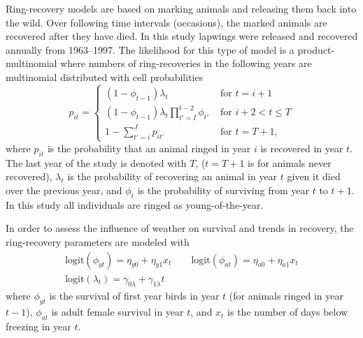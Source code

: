 \documentclass[12pt]{article}
\begin{document}
Ring-recovery models are based on marking animals and releasing them back into the wild. Over following time intervals (occasions), the marked animals are recovered after they have died. In this study lapwings were released and recovered annually from 1963--1997. The likelihood for this type of model is a product-multinomial where numbers of ring-recoveries in the following years are multinomial distributed with cell probabilities
\[
p_{it} = \left\{ 
\begin{array}{ll}
(1-\phi_{t-1})\lambda_t & \text{ for } t=i+1 \\
(1-\phi_{t-1})\lambda_t\prod_{t'=I}^{t-2} \phi_{t'} & \text{ for } i+2 < t \le T \\
1-\sum_{t'=i}^J p_{it'} & \text{ for } t=T+1,
\end{array} \right.
\]
where $p_{it}$ is the probability that an animal ringed in year $i$ is recovered in year $t$. The last year of the study is denoted with $T$, ($t=T+1$ is for animals never recovered), $\lambda_t$ is the probability of recovering an animal in year $t$ given it died over the previous year, and $\phi_t$ is the probability of surviving from year $t$ to $t+1$. In this study all individuals are ringed as young-of-the-year. 

In order to assess the influence of weather on survival and trends in recovery, the ring-recovery parameters are modeled with 
\begin{equation}
\begin{gathered}
\text{logit}(\phi_{yt}) = \eta_{y0} + \eta_{y1} x_t\qquad \text{logit}(\phi_{at}) = \eta_{a0}+ \eta_{a1} x_t\\
\text{logit}(\lambda_t) = \gamma_{0\lambda} + \gamma_{1\lambda} t
\end{gathered}
\end{equation}
where $\phi_{yt}$ is the survival of first year birds in year $t$ (for animals ringed in year $t-1$), $\phi_{at}$ is adult female survival in year $t$, and $x_t$ is the number of days below freezing in year $t$. 
\end{document}
